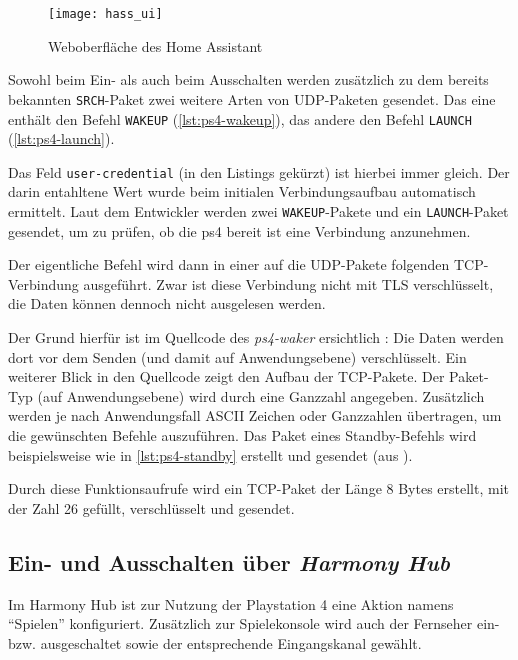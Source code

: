 \begin{figure}[h!]
    \centering
    \texttt{[image: hass\_ui]}
    \caption{Weboberfläche des Home Assistant}\label{fig:hass-ui}
\end{figure}

Sowohl beim Ein- als auch beim Ausschalten werden zusätzlich zu dem bereits bekannten \texttt{SRCH}-Paket
zwei weitere Arten von UDP-Paketen gesendet.
Das eine enthält den Befehl \texttt{WAKEUP} (\autoref{lst:ps4-wakeup}),
das andere den Befehl \texttt{LAUNCH} (\autoref{lst:ps4-launch}).




Das Feld \texttt{user-credential} (in den Listings gekürzt) ist hierbei immer gleich.
Der darin entahltene Wert wurde beim initialen Verbindungsaufbau automatisch ermittelt.
Laut dem Entwickler werden zwei \texttt{WAKEUP}-Pakete und ein \texttt{LAUNCH}-Paket gesendet,
um zu prüfen, ob die \ac{ps4} bereit ist eine Verbindung anzunehmen.



Der eigentliche Befehl wird dann in einer auf die UDP-Pakete folgenden TCP-Verbindung ausgeführt.
Zwar ist diese Verbindung nicht mit TLS verschlüsselt,
die Daten können dennoch nicht ausgelesen werden.

Der Grund hierfür ist im Quellcode des \textit{ps4-waker} ersichtlich \cite{ps4waker31:online}\cite{ps4waker93:online}:
Die Daten werden dort vor dem Senden (und damit auf Anwendungsebene) verschlüsselt.
Ein weiterer Blick in den Quellcode zeigt den Aufbau der TCP-Pakete.
Der Paket-Typ (auf Anwendungsebene) wird durch eine Ganzzahl angegeben.
Zusätzlich werden je nach Anwendungsfall ASCII Zeichen oder Ganzzahlen übertragen,
um die gewünschten Befehle auszuführen.
Das Paket eines Standby-Befehls wird beispielsweise wie in \autoref{lst:ps4-standby} erstellt und gesendet (aus \cite{ps4waker31:online}).



Durch diese Funktionsaufrufe wird ein TCP-Paket der Länge 8 Bytes erstellt,
mit der Zahl 26 gefüllt,
verschlüsselt und gesendet.

\newpage

\subsection{Ein- und Ausschalten über \textit{Harmony Hub}}\label{sec:durchfuehrung-harmony}
Im Harmony Hub ist zur Nutzung der Playstation 4 eine Aktion namens \enquote{Spielen} konfiguriert.
Zusätzlich zur Spielekonsole wird auch der Fernseher ein- bzw. ausgeschaltet sowie der entsprechende Eingangskanal gewählt.

